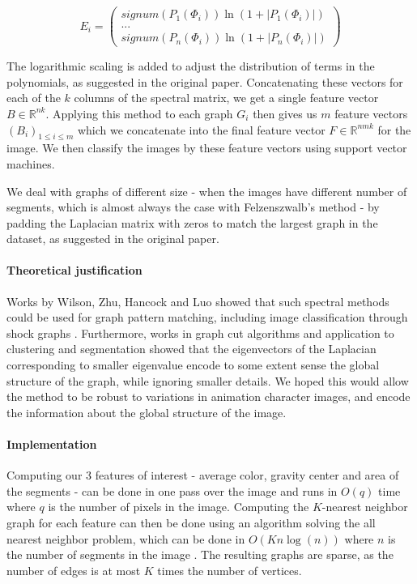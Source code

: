 \[
E_i = \begin{pmatrix}
signum(P_1(\Phi_i)) \ln(1 + |P_1(\Phi_i)|) \\
... \\
signum(P_n(\Phi_i)) \ln(1 + |P_n(\Phi_i)|)
\end{pmatrix}
\] 

The logarithmic scaling is added to adjust the distribution of terms in the polynomials, as suggested in the original paper. Concatenating these vectors for each of the $k$ columns of the spectral matrix, we get a single feature vector $B \in \mathbb{R}^{nk}$. Applying this method to each graph $G_i$ then gives us $m$ feature vectors $(B_i)_{1 \leq i \leq m}$ which we concatenate into the final feature vector $F \in \mathbb{R}^{nmk}$ for the image. We then classify the images by these feature vectors using support vector machines.

We deal with graphs of different size - when the images have different number of segments, which is almost always the case with Felzenszwalb's method - by padding the Laplacian matrix with zeros to match the largest graph in the dataset, as suggested in the original paper.

\paragraph{Theoretical justification}
Works by Wilson, Zhu, Hancock and Luo showed that such spectral methods could be used for graph pattern matching, including image classification through shock graphs \cite{wilson2005pattern}\cite{wilson2008study}. Furthermore, works in graph cut algorithms and application to clustering \cite{ng2002spectral} and segmentation\cite{shi2000normalized}\cite{meila2001random} showed that the eigenvectors of the Laplacian corresponding to smaller eigenvalue encode to some extent sense the global structure of the graph, while ignoring smaller details. We hoped this would allow the method to be robust to variations in animation character images, and encode the information about the global structure of the image.

\paragraph{Implementation}
Computing our $3$ features of interest - average color, gravity center and area of the segments - can be done in one pass over the image and runs in $O(q)$ time where $q$ is the number of pixels in the image. Computing the $K$-nearest neighbor graph for each feature can then be done using an algorithm solving the all nearest neighbor problem, which can be done in $O(Kn\log(n))$ where $n$ is the number of segments in the image \cite{clarkson1983fast}. The resulting graphs are sparse, as the number of edges is at most $K$ times the number of vertices.

